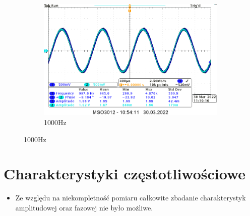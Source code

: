 \begin{itemize}
\begin{figure}[H]
\begin{subfigure}[h]{0.4\textwidth}
                \includegraphics[width=\textwidth]{img_osciloscope/CLR/CLR_1000Hz_cropped.png}
                \caption*{1000Hz}
            \end{subfigure}
        \end{figure}
\end{itemize}

\section{Charakterystyki częstotliwościowe}

\begin{itemize}
    \item Ze względu na niekompletność pomiaru całkowite zbadanie charakterystyk amplitudowej oraz fazowej nie było możliwe.
    
\end{itemize}